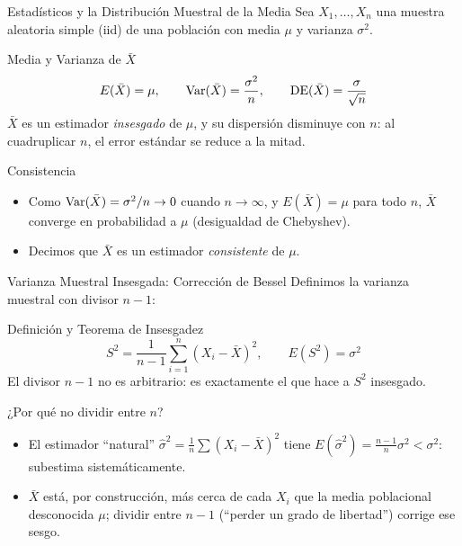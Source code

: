 \documentclass[10pt, aspectratio=169]{beamer}
\begin{document}
\begin{frame}{Estadísticos y la Distribución Muestral de la Media}
  \footnotesize
  Sea $X_1, \ldots, X_n$ una muestra aleatoria simple (iid) de una población con media $\mu$ y varianza $\sigma^2$. \pause

  \vspace{0.1cm}
  \begin{block}{Media y Varianza de $\bar{X}$}
    $$E(\bar{X}) = \mu, \qquad \operatorname{Var}(\bar{X}) = \dfrac{\sigma^2}{n}, \qquad \text{DE}(\bar{X}) = \dfrac{\sigma}{\sqrt{n}}$$
    $\bar{X}$ es un estimador \emph{insesgado} de $\mu$, y su dispersión disminuye con $n$: al cuadruplicar $n$, el error estándar se reduce a la mitad.
  \end{block}

  \vspace{0.1cm}
  \pause
  \begin{alertblock}{Consistencia}
    \begin{itemize}\itemsep=0.05cm
      \item Como $\operatorname{Var}(\bar{X}) = \sigma^2/n \to 0$ cuando $n\to\infty$, y $E(\bar{X})=\mu$ para todo $n$, $\bar{X}$ converge en probabilidad a $\mu$ (desigualdad de Chebyshev).
      \item Decimos que $\bar{X}$ es un estimador \emph{consistente} de $\mu$.
    \end{itemize}
  \end{alertblock}
\end{frame}

\begin{frame}{Varianza Muestral Insesgada: Corrección de Bessel}
  \footnotesize
  Definimos la varianza muestral con divisor $n-1$: \pause

  \vspace{0.1cm}
  \begin{block}{Definición y Teorema de Insesgadez}
    $$S^2 = \dfrac{1}{n-1}\sum_{i=1}^n (X_i-\bar{X})^2, \qquad E(S^2) = \sigma^2$$
    El divisor $n-1$ no es arbitrario: es exactamente el que hace a $S^2$ insesgado.
  \end{block}

  \vspace{0.1cm}
  \pause
  \begin{alertblock}{¿Por qué no dividir entre $n$?}
    \begin{itemize}\itemsep=0.05cm
      \item El estimador ``natural'' $\hat{\sigma}^2 = \frac{1}{n}\sum(X_i-\bar{X})^2$ tiene $E(\hat{\sigma}^2) = \frac{n-1}{n}\sigma^2 < \sigma^2$: subestima sistemáticamente.
      \item $\bar{X}$ está, por construcción, más cerca de cada $X_i$ que la media poblacional desconocida $\mu$; dividir entre $n-1$ (``perder un grado de libertad'') corrige ese sesgo.
    \end{itemize}
  \end{alertblock}
\end{frame}
\end{document}

